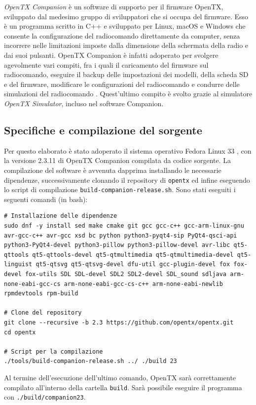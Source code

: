 \documentclass[a4paper, 12pt]{report} %
\begin{document}
\emph{OpenTX Companion} è un software di supporto per il firmware OpenTX, sviluppato dal medesimo gruppo di sviluppatori che si occupa del firmware. Esso è un programma scritto in C++ e sviluppato per Linux, macOS e Windows che consente la configurazione del radiocomando direttamente da computer, senza incorrere nelle limitazioni imposte dalla dimensione della schermata della radio e dai suoi pulsanti. OpenTX Companion è infatti adoperato per svolgere agevolmente vari compiti, fra i quali il caricamento del firmware sul radiocomando, eseguire il backup delle impostazioni dei modelli, della scheda SD e del firmware, modificare le configurazioni del radiocomando e condurre delle simulazioni del radiocomando \cite{opentx-companion-manual}. Quest'ultimo compito è svolto grazie al simulatore \emph{OpenTX Simulator}, incluso nel software Companion.

\subsection{Specifiche e compilazione del sorgente}
Per questo elaborato è stato adoperato il sistema operativo Fedora Linux 33 \cite{fedora-website}, con la versione 2.3.11 di OpenTX Companion compilata da codice sorgente.
La compilazione del software è avvenuta dapprima installando le necessarie dipendenze, successivamente clonando il repository di \texttt{opentx} ed infine eseguendo lo script di compilazione \texttt{build-companion-release.sh}. Sono stati eseguiti i seguenti comandi (in bash):

\begin{lstlisting}
# Installazione delle dipendenze
sudo dnf -y install sed make cmake git gcc gcc-c++ gcc-arm-linux-gnu avr-gcc-c++ avr-gcc xsd bc python python3-pyqt4-sip PyQt4-qsci-api python3-PyQt4-devel python3-pillow python3-pillow-devel avr-libc qt5-qttools qt5-qttools-devel qt5-qtmultimedia qt5-qtmultimedia-devel qt5-linguist qt5-qtsvg qt5-qtsvg-devel dfu-util gcc-plugin-devel fox fox-devel fox-utils SDL SDL-devel SDL2 SDL2-devel SDL_sound sdljava arm-none-eabi-gcc-cs arm-none-eabi-gcc-cs-c++ arm-none-eabi-newlib rpmdevtools rpm-build

# Clone del repository
git clone --recursive -b 2.3 https://github.com/opentx/opentx.git
cd opentx

# Script per la compilazione
./tools/build-companion-release.sh ../ ./build 23
\end{lstlisting}

Al termine dell'esecuzione dell'ultimo comando, OpenTX sarà correttamente compilato all'interno della cartella \texttt{build}. Sarà possibile eseguire il programma con \texttt{./build/companion23}.
\end{document}
